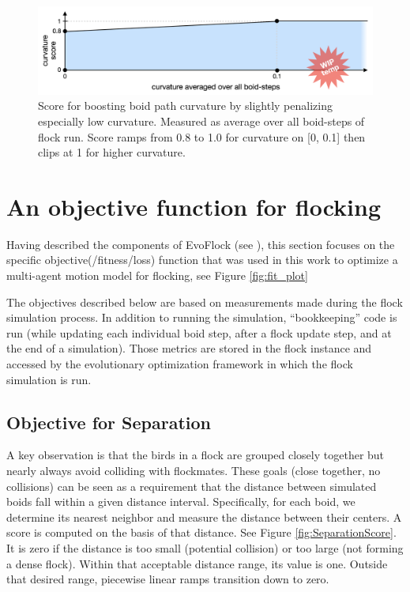 \documentclass[letterpaper]{article}
\begin{document}
\begin{figure}[b]

    \centering
    \includegraphics[width=0.9\linewidth]{images/temp_curve_score.png}
    \caption{Score for boosting boid path curvature by slightly penalizing especially low curvature. Measured as average over all boid-steps of flock run. Score ramps from 0.8 to 1.0 for curvature on [0, 0.1] then clips at 1 for higher curvature.}
    \label{fig:curve_score}
\end{figure}



\section{An objective function for flocking}
\label{sec:FlockingObjective}

Having described the components of EvoFlock (see ), this section focuses on the specific objective(/fitness/loss) function that was used in this work to optimize a multi-agent motion model for flocking, see Figure \ref{fig:fit_plot}

The objectives described below are based on measurements made during the flock simulation process. In addition to running the simulation, ``bookkeeping'' code is run (while updating each individual boid step, after a flock update step, and at the end of a simulation). Those metrics are stored in the flock instance and accessed by the evolutionary optimization framework in which the flock simulation is run.

\subsection{Objective for Separation}
\label{subsec:separation_objective}

A key observation is that the birds in a flock are grouped closely together but nearly always avoid colliding with flockmates. These goals (close together, no collisions) can be seen as a requirement that the distance between simulated boids fall within a given distance interval. Specifically, for each boid, we determine its nearest neighbor and measure the distance between their centers. A score is computed on the basis of that distance. See Figure \ref{fig:SeparationScore}. It is zero if the distance is too small (potential collision) or too large (not forming a dense flock). Within that acceptable distance range, its value is one. Outside that desired range, piecewise linear ramps transition down to zero.
\end{document}
